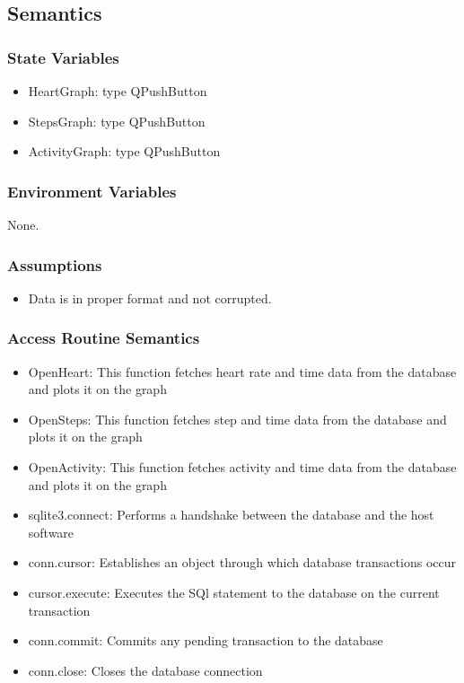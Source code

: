 \documentclass[12pt, titlepage]{article}
\begin{document}
\subsection{Semantics}

\subsubsection{State Variables}

\begin{itemize}
\item HeartGraph: type QPushButton
\item StepsGraph: type QPushButton
\item ActivityGraph: type QPushButton
\end{itemize}

\subsubsection{Environment Variables}

None.

\subsubsection{Assumptions}

\begin{itemize}
\item Data is in proper format and not corrupted.
\end{itemize}

\subsubsection{Access Routine Semantics}

\begin{itemize}
\item OpenHeart: This function fetches heart rate and time data from the database and plots it on the graph
\item OpenSteps: This function fetches step and time data from the database and plots it on the graph
\item OpenActivity: This function fetches activity and time data from the database and plots it on the graph
\item sqlite3.connect: Performs a handshake between the database and the host software
\item conn.cursor: Establishes an object through which database transactions occur
\item cursor.execute: Executes the SQl statement to the database on the current transaction
\item conn.commit: Commits any pending transaction to the database
\item conn.close: Closes the database connection
\end{itemize}
\end{document}
